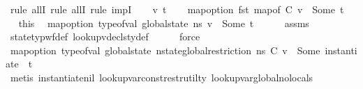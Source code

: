 \begin{isabellebody}
\isamarkupfalse%
\ {\isacharparenleft}{\kern0pt}rule\ allI{\isacharcomma}{\kern0pt}\ rule\ allI{\isacharcomma}{\kern0pt}\ rule\ impI{\isacharparenright}{\kern0pt}\isanewline
\ \ \isamarkupfalse%
\ v\ t\isanewline
\ \ \isamarkupfalse%
\ {\isachardoublequoteopen}map{\isacharunderscore}{\kern0pt}option\ fst\ {\isacharparenleft}{\kern0pt}map{\isacharunderscore}{\kern0pt}of\ C\ v{\isacharparenright}{\kern0pt}\ {\isacharequal}{\kern0pt}\ Some\ t{\isachardoublequoteclose}\isanewline
\ \ \isamarkupfalse%
\ \isamarkupfalse%
\ this\ \isamarkupfalse%
\ {\isachardoublequoteopen}map{\isacharunderscore}{\kern0pt}option\ type{\isacharunderscore}{\kern0pt}of{\isacharunderscore}{\kern0pt}val\ {\isacharparenleft}{\kern0pt}global{\isacharunderscore}{\kern0pt}state\ n{\isacharunderscore}{\kern0pt}s\ v{\isacharparenright}{\kern0pt}\ {\isacharequal}{\kern0pt}\ Some\ t{\isachardoublequoteclose}\isanewline
\ \ \ \ \isamarkupfalse%
\ assms\isanewline
\ \ \ \ \isamarkupfalse%
\ state{\isacharunderscore}{\kern0pt}typ{\isacharunderscore}{\kern0pt}wf{\isacharunderscore}{\kern0pt}def\ lookup{\isacharunderscore}{\kern0pt}vdecls{\isacharunderscore}{\kern0pt}ty{\isacharunderscore}{\kern0pt}def\isanewline
\ \ \ \ \isamarkupfalse%
\ force\ \ \isanewline
\ \ \isamarkupfalse%
\ \isamarkupfalse%
\ {\isachardoublequoteopen}map{\isacharunderscore}{\kern0pt}option\ type{\isacharunderscore}{\kern0pt}of{\isacharunderscore}{\kern0pt}val\ {\isacharparenleft}{\kern0pt}global{\isacharunderscore}{\kern0pt}state\ {\isacharparenleft}{\kern0pt}nstate{\isacharunderscore}{\kern0pt}global{\isacharunderscore}{\kern0pt}restriction\ n{\isacharunderscore}{\kern0pt}s\ C{\isacharparenright}{\kern0pt}\ v{\isacharparenright}{\kern0pt}\ {\isacharequal}{\kern0pt}\ Some\ {\isacharparenleft}{\kern0pt}instantiate\ {\isacharbrackleft}{\kern0pt}{\isacharbrackright}{\kern0pt}\ t{\isacharparenright}{\kern0pt}{\isachardoublequoteclose}\ \ \ \ \isanewline
\ \ \ \ \isamarkupfalse%
\ {\isacharparenleft}{\kern0pt}metis\ instantiate{\isacharunderscore}{\kern0pt}nil\ lookup{\isacharunderscore}{\kern0pt}var{\isacharunderscore}{\kern0pt}const{\isacharunderscore}{\kern0pt}restr{\isacharunderscore}{\kern0pt}util{\isacharunderscore}{\kern0pt}ty{\isacharunderscore}{\kern0pt}{}\ lookup{\isacharunderscore}{\kern0pt}var{\isacharunderscore}{\kern0pt}global{\isacharunderscore}{\kern0pt}no{\isacharunderscore}{\kern0pt}locals{\isacharparenright}{\kern0pt}\isanewline

\end{isabellebody}
